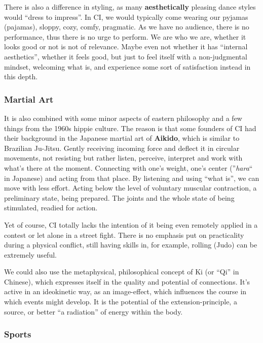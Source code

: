 There is also a difference in styling, as many \textbf{aesthetically} pleasing dance styles would ``dress to impress''.
In CI, we would typically come wearing our pyjamas (pajamas), sloppy, cozy, comfy, pragmatic.
As we have no audience, there is no performance, thus there is no urge to perform.
We are who we are, whether it looks good or not is not of relevance.
Maybe even not whether it has ``internal aesthetics'', whether it feels good, but just to feel itself with a non-judgmental mindset, welcoming what is, and experience some sort of satisfaction instead in this depth.

\subsubsection{Martial Art}

It is also combined with some minor aspects of eastern philosophy and a few things from the 1960s hippie culture.
The reason is that some founders of CI had their background in the Japanese martial art of \textbf{Aikido}, which is similar to Brazilian Ju-Jitsu.
Gently receiving incoming force and deflect it in circular movements, not resisting but rather listen, perceive, interpret and work with what's there at the moment.
Connecting with one's weight, one's center (''\textit{hara}`` in Japanese) and acting from that place.
By listening and using ``what is'', we can move with less effort.
Acting below the level of voluntary muscular contraction, a preliminary state, being prepared.
The joints and the whole state of being stimulated, readied for action.

Yet of course, CI totally lacks the intention of it being even remotely applied in a contest or let alone in a street fight.
There is no emphasis put on practicality during a physical conflict, still having skills in, for example, rolling (Judo) can be extremely useful.

We could also use the metaphysical, philosophical concept of Ki (or ``Qi'' in Chinese), which expresses itself in the quality and potential of connections.
It's active in an ideokinetic way, as an image-effect, which influences the course in which events might develop.
It is the potential of the extension-principle, a source, or better ``a radiation'' of energy within the body.

\subsubsection{Sports}

